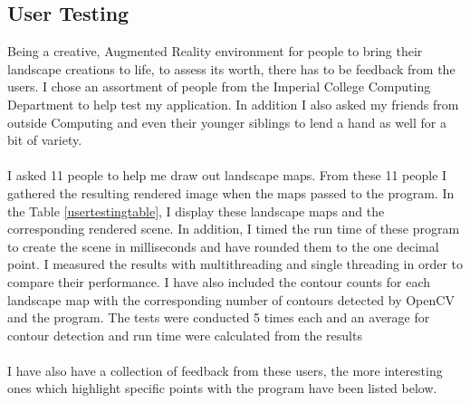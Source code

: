 \documentclass[11pt]{article}
\begin{document}
\subsection{User Testing}
Being a creative, Augmented Reality environment for people to bring their 
landscape creations to life, to assess its worth, there has to be feedback
from the users. I chose an assortment of people from the Imperial College
Computing Department to help test my application. In addition I also asked
my friends from outside Computing and even their younger siblings
to lend a hand as well for a bit of variety. \\
\\
I asked 11 people to help me draw out landscape maps. From these 11 people
I gathered the resulting rendered image when the maps passed to the
program. In the Table \ref{usertestingtable}, I display these
landscape maps and the corresponding rendered scene. In addition, I timed
the run time of these program to create the scene in milliseconds and have
rounded them to the one decimal point. I measured the results with
multithreading and single threading in order to compare their performance.
I have also included the contour counts for each landscape map with
the corresponding number of contours detected by OpenCV and the program.
The tests were conducted 5 times each and an average for contour
detection and run time were calculated from the results\\
\\
I have also have a collection of feedback from these users, the more
interesting ones which highlight specific points with the program have 
been listed below.
\end{document}
